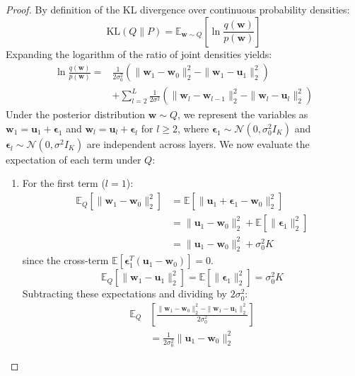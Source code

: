 \begin{proof}
By definition of the KL divergence over continuous probability densities:
\begin{equation}
\text{KL}(Q \| P) = \mathbb{E}_{\mathbf{w} \sim Q} \left[ \ln \frac{q(\mathbf{w})}{p(\mathbf{w})} \right]
\end{equation}
Expanding the logarithm of the ratio of joint densities yields:
\begin{align}
\ln \frac{q(\mathbf{w})}{p(\mathbf{w})} = &\frac{1}{2\sigma_0^2} \left( \|\mathbf{w}_1 - \mathbf{w}_0\|_2^2 - \|\mathbf{w}_1 - \mathbf{u}_1\|_2^2 \right) \nonumber \\
&+ \sum_{l=2}^L \frac{1}{2\sigma^2} \left( \|\mathbf{w}_l - \mathbf{w}_{l-1}\|_2^2 - \|\mathbf{w}_l - \mathbf{u}_l\|_2^2 \right)
\end{align}
Under the posterior distribution $\mathbf{w} \sim Q$, we represent the variables as $\mathbf{w}_1 = \mathbf{u}_1 + \boldsymbol{\epsilon}_1$ and $\mathbf{w}_l = \mathbf{u}_l + \boldsymbol{\epsilon}_l$ for $l \ge 2$, where $\boldsymbol{\epsilon}_1 \sim \mathcal{N}(0, \sigma_0^2 I_K)$ and $\boldsymbol{\epsilon}_l \sim \mathcal{N}(0, \sigma^2 I_K)$ are independent across layers. We now evaluate the expectation of each term under $Q$:
\begin{enumerate}
    \item For the first term ($l=1$):
    \begin{align}
    \mathbb{E}_{Q} [\|\mathbf{w}_1 - \mathbf{w}_0\|_2^2] &= \mathbb{E} [\|\mathbf{u}_1 + \boldsymbol{\epsilon}_1 - \mathbf{w}_0\|_2^2] \nonumber \\
    &= \|\mathbf{u}_1 - \mathbf{w}_0\|_2^2 + \mathbb{E}[\|\boldsymbol{\epsilon}_1\|_2^2] \nonumber \\
    &= \|\mathbf{u}_1 - \mathbf{w}_0\|_2^2 + \sigma_0^2 K
    \end{align}
    since the cross-term $\mathbb{E}[\boldsymbol{\epsilon}_1^T (\mathbf{u}_1 - \mathbf{w}_0)] = 0$.
    \begin{equation}
    \mathbb{E}_{Q} [\|\mathbf{w}_1 - \mathbf{u}_1\|_2^2] = \mathbb{E}[\|\boldsymbol{\epsilon}_1\|_2^2] = \sigma_0^2 K
    \end{equation}
    Subtracting these expectations and dividing by $2\sigma_0^2$:
    \begin{equation}
    \begin{split}
    \mathbb{E}_{Q} &\left[ \frac{\|\mathbf{w}_1 - \mathbf{w}_0\|_2^2 - \|\mathbf{w}_1 - \mathbf{u}_1\|_2^2}{2\sigma_0^2} \right] \\
    &= \frac{1}{2\sigma_0^2} \|\mathbf{u}_1 - \mathbf{w}_0\|_2^2
    \end{split}
    \end{equation}


\end{enumerate}
\end{proof}
